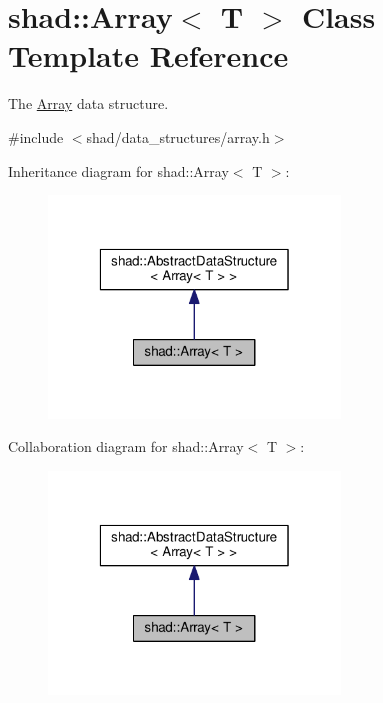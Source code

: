 \hypertarget{classshad_1_1Array}{\section{shad\-:\-:Array$<$ T $>$ Class Template Reference}
\label{classshad_1_1Array}
}


The \hyperlink{classshad_1_1Array}{Array} data structure.  




{\ttfamily \#include $<$shad/data\-\_\-structures/array.\-h$>$}



Inheritance diagram for shad\-:\-:Array$<$ T $>$\-:
\nopagebreak
\begin{figure}[H]
\begin{center}
\leavevmode
\includegraphics[width=220pt]{classshad_1_1Array__inherit__graph}
\end{center}
\end{figure}


Collaboration diagram for shad\-:\-:Array$<$ T $>$\-:
\nopagebreak
\begin{figure}[H]
\begin{center}
\leavevmode
\includegraphics[width=220pt]{classshad_1_1Array__coll__graph}
\end{center}
\end{figure}
